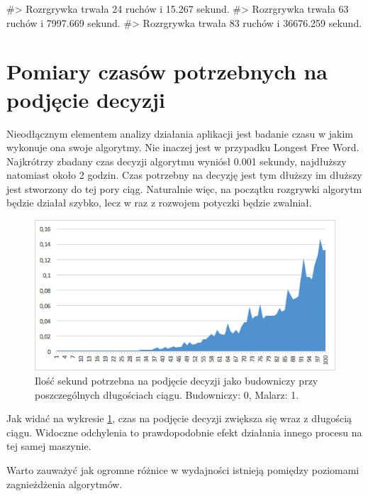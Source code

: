 \documentclass[document]{xmgr}
\begin{document}
#> Rozrgrywka trwała 24 ruchów i 15.267 sekund.
#> Rozrgrywka trwała 63 ruchów i 7997.669 sekund.
#> Rozrgrywka trwała 83 ruchów i 36676.259 sekund.

\fi

\section{Pomiary czasów potrzebnych na podjęcie decyzji}
Nieodłącznym elementem analizy działania aplikacji jest badanie czasu w jakim wykonuje ona swoje algorytmy. Nie inaczej jest w przypadku Longest Free Word. Najkrótrzy zbadany czas decyzji algorytmu wyniósł 0.001 sekundy, najdłuższy natomiast około 2 godzin. Czas potrzebny na decyzję jest tym dłuższy im dłuższy jest stworzony do tej pory ciąg. Naturalnie więc, na początku rozgrywki algorytm będzie działał szybko, lecz w raz z rozwojem potyczki będzie zwalniał. 

\begin{figure}[H]
    \centering
    \includegraphics[scale = 0.7]{images/timeBuilder0Painter1}
    \caption{Ilość sekund potrzebna na podjęcie decyzji jako budowniczy przy poszczególnych długościach ciągu. Budowniczy: 0, Malarz: 1.}
    \label{fig:builder0painter1}
\end{figure}

Jak widać na wykresie \ref{fig:builder0painter1}, czas na podjęcie decyzji zwiększa się wraz z długością ciągu. Widoczne odchylenia to prawdopodobnie efekt działania innego procesu na tej samej maszynie.

Warto zauważyć jak ogromne różnice w wydajności istnieją pomiędzy poziomami zagnieżdżenia algorytmów.
\end{document}
